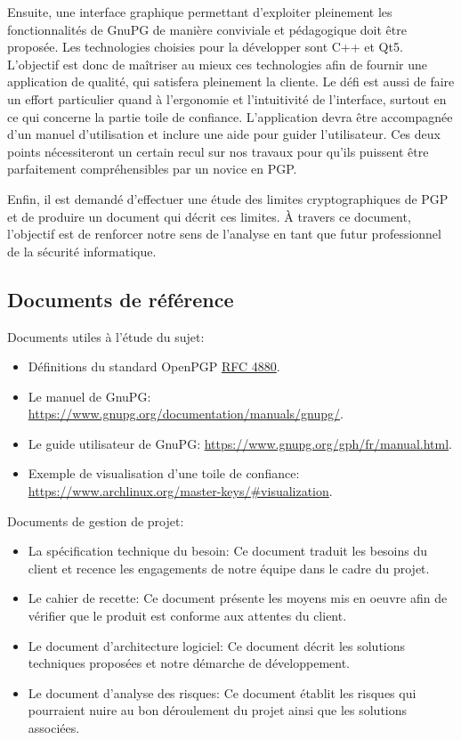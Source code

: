 \documentclass{../res/univ-projet}
\begin{document}
Ensuite, une interface graphique permettant d'exploiter pleinement les fonctionnalités de GnuPG de manière conviviale et pédagogique doit être 
proposée. Les technologies choisies pour la développer sont C++ et Qt5. L'objectif est donc de maîtriser au mieux ces technologies afin 
de fournir une application de qualité, qui satisfera pleinement la cliente. Le défi est aussi de faire un effort particulier quand à l'ergonomie 
et l'intuitivité de l'interface, surtout en ce qui concerne la partie toile de confiance. L'application devra être accompagnée d'un manuel 
d'utilisation et inclure une aide pour guider l'utilisateur. Ces deux points nécessiteront un certain recul sur nos travaux pour qu'ils 
puissent être parfaitement compréhensibles par un novice en PGP.

Enfin, il est demandé d'effectuer une étude des limites cryptographiques de PGP et de produire un document qui décrit ces limites. \`{A} travers 
ce document, l'objectif est de renforcer notre sens de l'analyse en tant que futur professionnel de la sécurité informatique.

\subsection{Documents de référence}

Documents utiles à l'étude du sujet: \\
\begin{itemize}
\item Définitions du standard OpenPGP \href{http://tools.ietf.org/html/rfc4880}{RFC 4880}.
\item Le manuel de GnuPG: \href{https://www.gnupg.org/documentation/manuals/gnupg/}{https://www.gnupg.org/documentation/manuals/gnupg/}.
\item Le guide utilisateur de GnuPG: \href{https://www.gnupg.org/gph/fr/manual.html}{https://www.gnupg.org/gph/fr/manual.html}.
\item Exemple de visualisation d'une toile de confiance: \href{https://www.archlinux.org/master-keys/#visualization}{https://www.archlinux.org/master-keys/\#visualization}. \\
\end{itemize}


Documents de gestion de projet: \\
\begin{itemize}
\item La spécification technique du besoin: Ce document traduit les besoins du client et recence les engagements de notre équipe dans le cadre du projet.
\item Le cahier de recette: Ce document présente les moyens mis en oeuvre afin de vérifier que le produit est conforme aux attentes du client.
\item Le document d'architecture logiciel: Ce document décrit les solutions techniques proposées et notre démarche de développement.
\item Le document d'analyse des risques: Ce document établit les risques qui pourraient nuire au bon déroulement du projet ainsi que les solutions associées.
\end{itemize}
\end{document}
